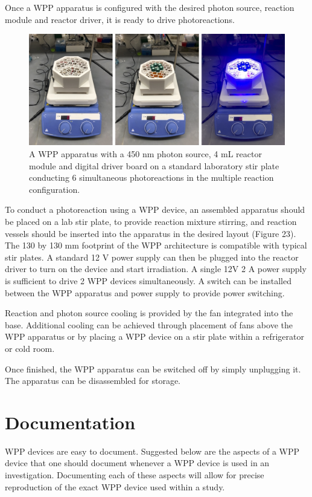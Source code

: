 \documentclass[11pt]{article}
\let\stdsection\section
\renewcommand\section{\clearpage\stdsection}
\begin{document}
Once a WPP apparatus is configured with the desired photon source, reaction module and reactor driver, it is ready to drive photoreactions.

\begin{figure}[H]
  \centering
  \includegraphics[width=\textwidth]{"./fign8.png"}
  \caption{A WPP apparatus with a 450 nm photon source, 4 mL reactor module and digital driver board on a standard laboratory stir plate conducting 6 simultaneous photoreactions in the multiple reaction configuration.}
\end{figure}

To conduct a photoreaction using a WPP device, an assembled apparatus should be placed on a lab stir plate, to provide reaction mixture stirring, and reaction vessels should be inserted into the apparatus in the desired layout (Figure 23).
The 130 by 130 mm footprint of the WPP architecture is compatible with typical stir plates.
A standard 12 V power supply can then be plugged into the reactor driver to turn on the device and start irradiation.
A single 12V 2 A power supply is sufficient to drive 2 WPP devices simultaneously.
A switch can be installed between the WPP apparatus and power supply to provide power switching.

Reaction and photon source cooling is provided by the fan integrated into the base.
Additional cooling can be achieved through placement of fans above the WPP apparatus or by placing a WPP device on a stir plate within a refrigerator or cold room.

Once finished, the WPP apparatus can be switched off by simply unplugging it. The apparatus can be disassembled for storage.

\section{Documentation}

WPP devices are easy to document.
Suggested below are the aspects of a WPP device that one should document whenever a WPP device is used in an investigation. 
Documenting each of these aspects will allow for precise reproduction of the exact WPP device used within a study. 
\end{document}
